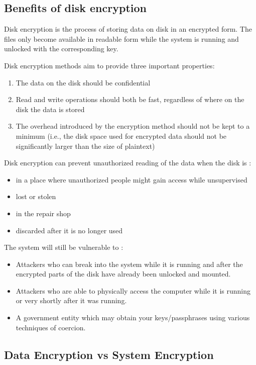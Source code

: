 \subsection{Benefits of disk encryption}
\label{sub-sec:benefits-enc}

Disk encryption is the process of storing data on disk in an encrypted form. The files only become available in readable form while the system is running and unlocked with the corresponding key.

Disk encryption methods aim to provide three important properties:
\begin{enumerate}
\item The data on the disk should be confidential
\item Read and write operations should both be fast, regardless of where on the disk the data is stored
\item The overhead introduced by the encryption method should not be kept to a minimum (i.e., the disk space used for encrypted data should not be significantly larger than the size of plaintext)
\end{enumerate}

Disk encryption can prevent unauthorized reading of the data when the disk is
\cite{disk-enc}:
\begin{itemize}
\item in a place where unauthorized people might gain access while unsupervised
\item lost or stolen
\item in the repair shop
\item discarded after it is no longer used
\end{itemize}

The system will still be vulnerable to
\cite{disk-enc}:
\begin{itemize}
\item Attackers who can break into the system while it is running and after the encrypted parts of the disk have already been unlocked and mounted.
\item Attackers who are able to physically access the computer while it is running or very shortly after it was running.
\item A government entity which may obtain your keys/passphrases using various techniques of coercion.
\end{itemize}

\subsection{Data Encryption vs System Encryption}
\label{sub-sec:de-vs-se}

